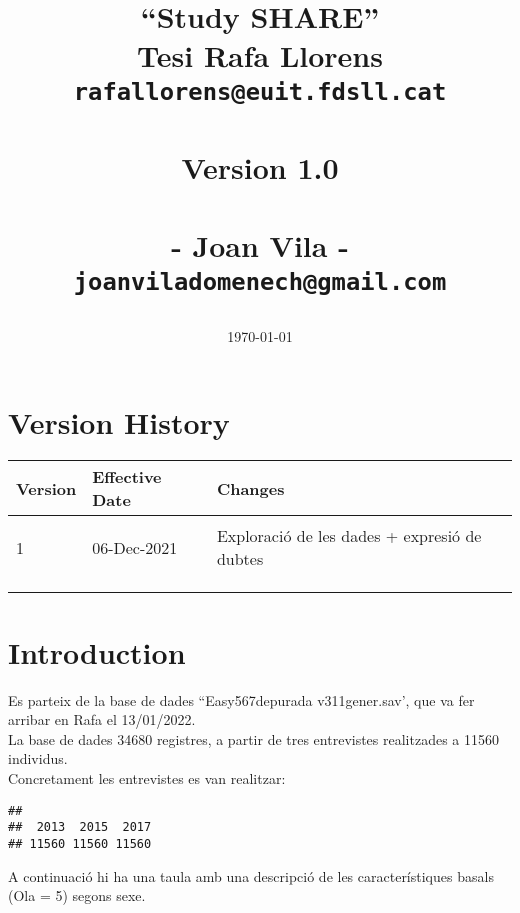 \documentclass[a4paper,12pt, titlepage]{article}\usepackage[]{graphicx}\usepackage[]{color}
\title{
\begin{center}
\textbf{\Huge {\color{red}``Study SHARE''}\\
\small Tesi Rafa Llorens\\
 \texttt{rafallorens@euit.fdsll.cat}\\
\
\\
\large Version 1.0}\\
\
\\
{\large - Joan Vila -\\
\texttt{joanviladomenech@gmail.com} }
\date{\today} 
\end{center}
}
\makeatletter
\newenvironment{kframe}{%
 \def\at@end@of@kframe{}%
 \ifinner\ifhmode%
  \def\at@end@of@kframe{\end{minipage}}%
  \begin{minipage}{\columnwidth}%
 \fi\fi%
 \def\FrameCommand##1{\hskip\@totalleftmargin \hskip-\fboxsep
 \colorbox{shadecolor}{##1}\hskip-\fboxsep
     \hskip-\linewidth \hskip-\@totalleftmargin \hskip\columnwidth}%
 \MakeFramed {\advance\hsize-\width
   \@totalleftmargin\z@ \linewidth\hsize
   \@setminipage}}%
 {\par\unskip\endMakeFramed%
 \at@end@of@kframe}
\newenvironment{knitrout}{}{} %
\makeatother
\begin{document}
\maketitle
\newpage

\section{Version History}
\begin{table}[H]
\centering
\begin{tabular}{L{2cm}  C{3.5cm}  L{9cm}}
\hline
Version  & Effective Date & Changes \\
\hline
 &  & \\
1 & 06-Dec-2021  & Exploració de les dades + expresió de dubtes\\
 &  & \\
 &  & \\
 &  & \\
\hline
\end{tabular}
\end{table}
\newpage
\tableofcontents



\newpage

\section{Introduction}

Es parteix de la base de dades ``Easy567depurada v311gener.sav', que va fer arribar en Rafa el 13/01/2022.\\

La base de dades 34680 registres, a partir de tres entrevistes realitzades a 11560 individus. \\

Concretament les entrevistes es van realitzar:
\begin{knitrout}
\color{fgcolor}\begin{kframe}
\begin{verbatim}
## 
##  2013  2015  2017 
## 11560 11560 11560
\end{verbatim}
\end{kframe}
\end{knitrout}

A continuació hi ha una taula amb una descripció de les característiques basals (Ola = 5) segons sexe.  \\
\end{document}
